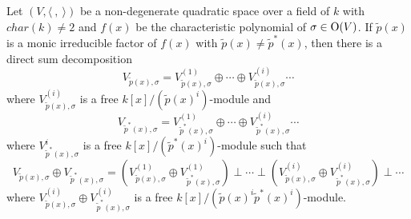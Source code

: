 \documentclass[12pt]{amsart}
\begin{document}
\begin{thm}  \label{splitting} Let $(V,  \langle \  , \  \rangle)$ be a non-degenerate quadratic space over a field of $k$ with $char(k)\neq 2$ and $f(x)$ be the characteristic polynomial of $\sigma\in {\rm O}(V)$.  If $\tilde{p}(x)$ is a monic irreducible factor of $f(x)$ with
$ \tilde{p}(x) \neq \tilde{p}^*(x) $,  then there is a direct sum decomposition
$$ V_{\tilde{p}(x), \sigma} = V_{\tilde{p}(x), \sigma}^ {(1)}\oplus \cdots \oplus V_{\tilde{p}(x), \sigma}^ {(i)}  \cdots $$
where $V_{\tilde{p}(x), \sigma}^ {(i)}$ is a free $k[x]/(\tilde{p}(x)^i)$-module and 
$$ V_{\tilde{p}^*(x), \sigma} = V_{\tilde{p}^*(x), \sigma}^ {(1)}\oplus \cdots \oplus V_{\tilde{p}^*(x), \sigma}^ {(i)}  \cdots $$ 
where $V_{\tilde{p}^*(x), \sigma}^ {i}$ is  a free $k[x]/(\tilde{p}^*(x)^i)$-module  such that 
$$ V_{\tilde{p}(x), \sigma} \oplus V_{\tilde{p}^*(x), \sigma}  = (V_{\tilde{p}(x), \sigma}^ {(1)}\oplus V_{\tilde{p}^*(x), \sigma}^ {(1)}) \perp \cdots \perp (V_{\tilde{p}(x), \sigma}^ {(i)} \oplus V_{\tilde{p}^*(x), \sigma}^ {(i)}) \perp \cdots $$
where $V_{\tilde{p}(x), \sigma}^ {(i)} \oplus V_{\tilde{p}^*(x), \sigma}^ {(i)}$ is a free $k[x]/(\tilde{p}(x)^i \tilde{p}^*(x)^i)$-module. 
\end{thm}
\end{document}
